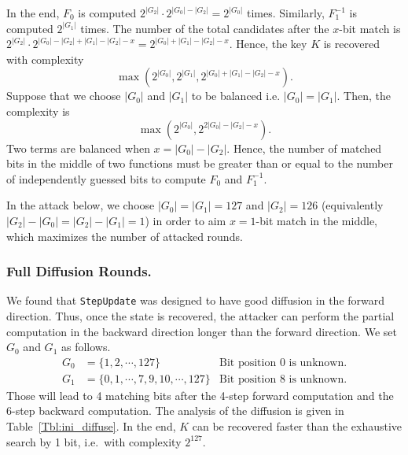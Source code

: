 In the end,
$F_0$ is computed $2^{|G_2|} \cdot 2^{|G_0|-|G_2|} = 2^{|G_0|}$ times.
Similarly, $F_1^{-1}$ is computed $2^{|G_1|}$ times. The number of the total candidates after the $x$-bit match is $2^{|G_2|} \cdot 2^{|G_0|-|G_2| + |G_1|-|G_2| - x} = 2^{|G_0| + |G_1| - |G_2| - x}$. Hence, the key $K$ is recovered with complexity $$\max( 2^{|G_0|}, 2^{|G_1|}, 2^{|G_0| + |G_1| - |G_2| - x}).$$
Suppose that we choose $|G_0|$ and $|G_1|$ to be balanced i.e. $|G_0|=|G_1|$. Then, the complexity is $$\max( 2^{|G_0|}, 2^{2|G_0| - |G_2| - x}).$$
Two terms are balanced when $x = |G_0| - |G_2|$. Hence, the number of matched bits in the middle of two functions must be greater than or equal to the number of independently guessed bits to compute $F_0$ and $F_1^{-1}$.

In the attack below, we choose $|G_0|=|G_1|=127$ and $|G_2|=126$ (equivalently $|G_2|-|G_0| = |G_2|-|G_1| = 1$) in order to aim $x=1$-bit match in the middle, which maximizes the number of attacked rounds.

\subsubsection{Full Diffusion Rounds.}
We found that {\tt StepUpdate} was designed to have good diffusion in the forward direction. Thus, once the state is recovered, the attacker can perform the partial computation in the backward direction longer than the forward direction. We set $G_0$ and $G_1$ as follows.
\begin{align*}
G_0 &= \{1, 2, \cdots, 127\} & \textrm {Bit position 0 is unknown.}\\
G_1 &= \{0, 1, \cdots, 7, 9, 10, \cdots, 127\} & \textrm {Bit position 8 is unknown.}
\end{align*}
Those will lead to 4 matching bits after the 4-step forward computation and the 6-step backward computation. The analysis of the diffusion is given in Table~\ref{Tbl:ini_diffuse}. In the end, $K$ can be recovered faster than the exhaustive search by 1 bit, i.e.~with complexity $2^{127}$.


